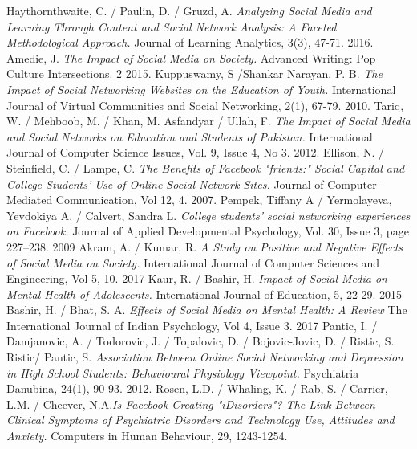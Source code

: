 \documentclass[lettersize,journal]{IEEEtran}
\begin{document}
\begin{thebibliography}{}
    Haythornthwaite, C. / Paulin, D. / Gruzd, A. {\it{Analyzing Social Media
        and Learning Through Content and Social Network Analysis: A Faceted
        Methodological Approach.}} Journal of Learning Analytics, 3(3), 47-71.
        2016.
        Amedie, J. {\it{The Impact of Social Media on Society.}}
        Advanced Writing: Pop Culture Intersections. 2
        2015.
        Kuppuswamy, S /Shankar Narayan, P. B. {\it{The Impact of Social Networking Websites on the Education of Youth.}}
        International Journal of Virtual Communities and Social Networking, 2(1), 67-79.
        2010.
        Tariq, W. / Mehboob, M. / Khan, M. Asfandyar / Ullah, F. {\it{The Impact of Social Media and Social Networks on Education and Students of Pakistan.}} International Journal of Computer Science Issues, Vol. 9, Issue 4, No 3.
        2012.
        Ellison, N. / Steinfield, C. / Lampe, C. {\it{The Benefits of Facebook "friends:" Social Capital and College Students' Use of Online Social Network Sites.}} Journal of Computer-Mediated Communication, Vol 12, 4.
        2007.
        Pempek, Tiffany A / Yermolayeva, Yevdokiya A. / Calvert, Sandra L. {\it{College students’ social networking experiences on
                Facebook.}} Journal of Applied Developmental Psychology, Vol. 30, Issue 3, page 227–238.
        2009
        Akram, A. / Kumar, R. {\it{A Study on Positive and Negative Effects of Social Media on Society.}}
        International Journal of Computer Sciences and Engineering, Vol 5, 10.
        2017
        Kaur, R. / Bashir, H. {\it{Impact of Social Media on Mental Health of Adolescents.}}
        International Journal of Education, 5, 22-29.
        2015
        Bashir, H. / Bhat, S. A. {\it{Effects of Social Media on Mental Health: A Review}}
        The International Journal of Indian Psychology, Vol 4, Issue 3.
        2017
        Pantic, I. / Damjanovic, A. / Todorovic, J. / Topalovic, D. / Bojovic-Jovic, D. / Ristic, S. Ristic/ Pantic, S.
        {\it{Association Between Online Social Networking and Depression in High School Students: Behavioural Physiology Viewpoint.}}
        Psychiatria Danubina, 24(1), 90-93.
        2012.
        Rosen, L.D. / Whaling, K. / Rab, S. / Carrier, L.M. / Cheever, N.A.{\it{Is Facebook Creating "iDisorders"? The Link Between Clinical Symptoms of Psychiatric Disorders and Technology Use, Attitudes and Anxiety.}} Computers in Human Behaviour, 29, 1243-1254.

\end{thebibliography}
\end{document}
